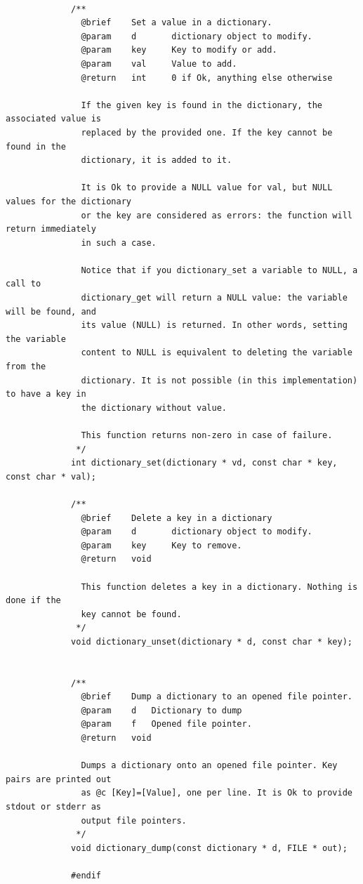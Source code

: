 \documentclass{article}
\begin{document}
\begin{Verbatim}[gobble=8]
             
             /**
               @brief    Set a value in a dictionary.
               @param    d       dictionary object to modify.
               @param    key     Key to modify or add.
               @param    val     Value to add.
               @return   int     0 if Ok, anything else otherwise
             
               If the given key is found in the dictionary, the associated value is
               replaced by the provided one. If the key cannot be found in the
               dictionary, it is added to it.
             
               It is Ok to provide a NULL value for val, but NULL values for the dictionary
               or the key are considered as errors: the function will return immediately
               in such a case.
             
               Notice that if you dictionary_set a variable to NULL, a call to
               dictionary_get will return a NULL value: the variable will be found, and
               its value (NULL) is returned. In other words, setting the variable
               content to NULL is equivalent to deleting the variable from the
               dictionary. It is not possible (in this implementation) to have a key in
               the dictionary without value.
             
               This function returns non-zero in case of failure.
              */
             int dictionary_set(dictionary * vd, const char * key, const char * val);
             
             /**
               @brief    Delete a key in a dictionary
               @param    d       dictionary object to modify.
               @param    key     Key to remove.
               @return   void
             
               This function deletes a key in a dictionary. Nothing is done if the
               key cannot be found.
              */
             void dictionary_unset(dictionary * d, const char * key);
             
             
             /**
               @brief    Dump a dictionary to an opened file pointer.
               @param    d   Dictionary to dump
               @param    f   Opened file pointer.
               @return   void
             
               Dumps a dictionary onto an opened file pointer. Key pairs are printed out
               as @c [Key]=[Value], one per line. It is Ok to provide stdout or stderr as
               output file pointers.
              */
             void dictionary_dump(const dictionary * d, FILE * out);
             
             #endif             
            \end{Verbatim}
\end{document}
